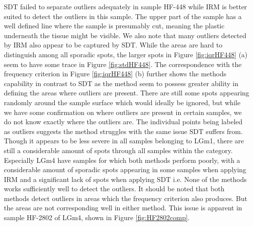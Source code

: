 SDT failed to separate outliers adequately in sample HF-448 while IRM is better suited to detect the outliers in this sample. The upper part of the sample has a well defined line where the sample is presumably cut, meaning the plastic underneath the tissue might be visible. We also note that many outliers detected by IRM also appear to be captured by SDT. While the areas are hard to distinguish among all sporadic spots, the larger spots in Figure \ref{fig:iqrHF448} (a) seem to have some trace in Figure \ref{fig:stdHF448}. The correspondence with the frequency criterion in Figure \ref{fig:iqrHF448} (b) further shows the methods capability in contrast to SDT as the method seem to possess greater ability in defining the areas where outliers are present. There are still some spots appearing randomly around the sample surface which would ideally be ignored, but while we have some confirmation on where outliers are present in certain samples, we do not know exactly where the outliers are. The individual points being labeled as outliers suggests the method struggles with the same issue SDT suffers from. Though it appears to be less severe in all samples belonging to LGm1, there are still a considerable amount of spots through all samples within the category. Especially LGm4 have samples for which both methods perform poorly, with a considerable amount of sporadic spots appearing in some samples when applying IRM and a significant lack of spots when applying SDT i.e. None of the methods works sufficiently well to detect the outliers. It should be noted that both methods detect outliers in areas which the frequency criterion also produces. But the areas are not corresponding well in either method. This issue is apparent in sample HF-2802 of LGm4, shown in Figure \ref{fig:HF2802comp}.

